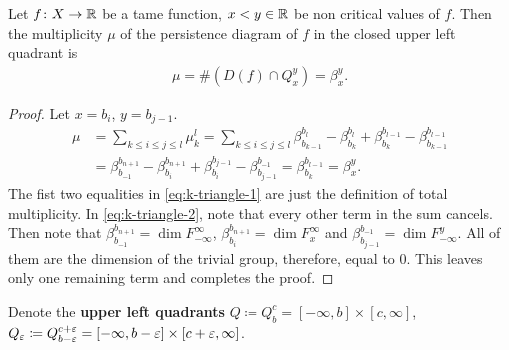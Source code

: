 \begin{lemma} \label{lemma:k-triangle}
    Let $ f\colon X \to \mathbb R $ be a tame function, $ x < y \in \mathbb R $ be non critical values of $ f $. Then the multiplicity $\mu $ of the persistence diagram of $ f $ in the closed upper left quadrant is 
    \begin{align}
        \mu = \# (D(f) \cap Q_x^y) = \beta_x^y.
    \end{align}
\end{lemma}
\begin{proof}
    Let $ x = b_i $, $ y = b_{j-1} $.
    \begin{align} 
        \mu &= \sum_{k \leq i \leq j \leq l} \mu_k^l = \sum_{k \leq i \leq j \leq l} \beta_{b_{k-1}}^{b_l} - \beta_{b_k}^{b_l} + \beta_{b_k}^{b_{l-1}} - \beta_{b_{k-1}}^{b_{l-1}} \label{eq:k-triangle-1} \\
        &= \beta_{b_{-1}}^{b_{n+1}} - \beta_{b_i}^{b_{n+1}} + \beta_{b_i}^{b_{j-1}} - \beta_{b_{j-1}}^{b_{-1}} = \beta_{b_k}^{b_{l-1}} = \beta_x^y. \label{eq:k-triangle-2}
    \end{align}
    The fist two equalities in \eqref{eq:k-triangle-1} are just the definition of total multiplicity. In \eqref{eq:k-triangle-2}, note that every other term in the sum cancels. Then note that $ \beta_{b_{-1}}^{b_{n+1}} = \dim F_{-\infty}^{\infty} $, $ \beta_{b_i}^{b_{n+1}} = \dim F_{x}^{\infty} $ and $ \beta_{b_{j-1}}^{b_{-1}} = \dim F_{-\infty}^y $. All of them are the dimension of the trivial group, therefore, equal to $ 0 $. This leaves only one remaining term and completes the proof.
\end{proof}

Denote the {\bf upper left quadrants} $ Q \coloneq Q_b^c = [-\infty, b] \times [c, \infty] $, $ Q_\varepsilon \coloneq Q_{b-\varepsilon}^{c+\varepsilon} = [-\infty, b-\varepsilon] \times [c+\varepsilon, \infty] $.

